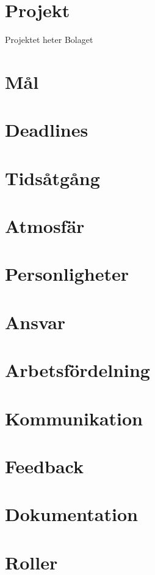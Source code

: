 
\section*{Projekt}
Projektet heter Bolaget

\section*{Mål}


\section*{Deadlines}

\section*{Tidsåtgång}


\section*{Atmosfär}

\section*{Personligheter}


\section*{Ansvar}

\section*{Arbetsfördelning}

\section*{Kommunikation}

\section*{Feedback}

\section*{Dokumentation}

\section*{Roller}

